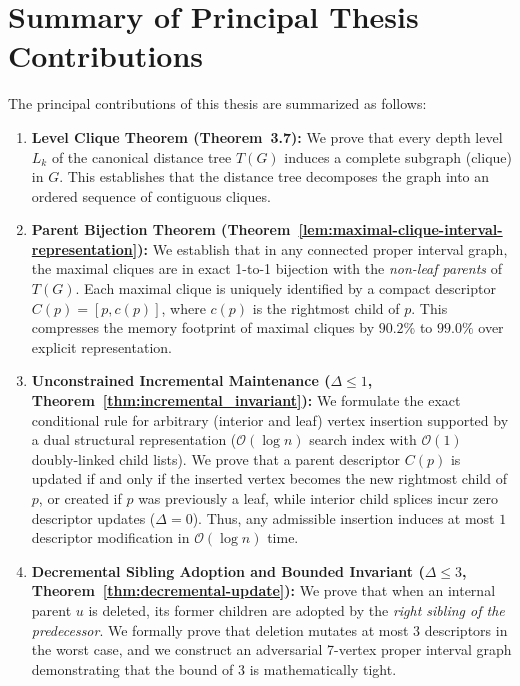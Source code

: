 \section{Summary of Principal Thesis Contributions}
\label{sec:intro_contributions}

The principal contributions of this thesis are summarized as follows:

\begin{enumerate}[label=\textbf{\arabic*.}]
    \item \textbf{Level Clique Theorem (Theorem~3.7):} We prove that every depth level $L_k$ of the canonical distance tree $T(G)$ induces a complete subgraph (clique) in $G$. This establishes that the distance tree decomposes the graph into an ordered sequence of contiguous cliques.
    
    \item \textbf{Parent Bijection Theorem (Theorem~\ref{lem:maximal-clique-interval-representation}):} We establish that in any connected proper interval graph, the maximal cliques are in exact 1-to-1 bijection with the \emph{non-leaf parents} of $T(G)$. Each maximal clique is uniquely identified by a compact descriptor $C(p) = [p, c(p)]$, where $c(p)$ is the rightmost child of $p$. This compresses the memory footprint of maximal cliques by $90.2\%$ to $99.0\%$ over explicit representation.
    
    \item \textbf{Unconstrained Incremental Maintenance ($\Delta \le 1$, Theorem~\ref{thm:incremental_invariant}):} We formulate the exact conditional rule for arbitrary (interior and leaf) vertex insertion supported by a dual structural representation ($\mathcal{O}(\log n)$ search index with $\mathcal{O}(1)$ doubly-linked child lists). We prove that a parent descriptor $C(p)$ is updated if and only if the inserted vertex becomes the new rightmost child of $p$, or created if $p$ was previously a leaf, while interior child splices incur zero descriptor updates ($\Delta = 0$). Thus, any admissible insertion induces at most $1$ descriptor modification in $\mathcal{O}(\log n)$ time.
    
    \item \textbf{Decremental Sibling Adoption and Bounded Invariant ($\Delta \le 3$, Theorem~\ref{thm:decremental-update}):} We prove that when an internal parent $u$ is deleted, its former children are adopted by the \emph{right sibling of the predecessor}. We formally prove that deletion mutates at most $3$ descriptors in the worst case, and we construct an adversarial 7-vertex proper interval graph demonstrating that the bound of $3$ is mathematically tight.
    

\end{enumerate}
